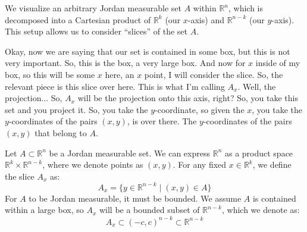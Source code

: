 \begin{math-stroke}
\begin{center}
\end{center}

\begin{explanation-of-steps}
We visualize an arbitrary Jordan measurable set $A$ within $\mathbb{R}^n$, which is decomposed into a Cartesian product of $\mathbb{R}^k$ (our $x$-axis) and $\mathbb{R}^{n-k}$ (our $y$-axis). This setup allows us to consider ``slices'' of the set $A$.
\end{explanation-of-steps}
\end{math-stroke}

\begin{spoken-clean}[00:00:39 - 00:01:23]
Okay, now we are saying that our set is contained in some box, but this is not very important. So, this is the box, a very large box. And now for $x$ inside of my box, so this will be some $x$ here, an $x$ point, I will consider the slice. So, the relevant piece is this slice over here. This is what I'm calling $A_x$. Well, the projection... So, $A_x$ will be the projection onto this axis, right? So, you take this set and you project it. So, you take the $y$-coordinate, so given the $x$, you take the $y$-coordinates of the pairs $(x,y)$, is over there. The $y$-coordinates of the pairs $(x,y)$ that belong to $A$.
\end{spoken-clean}

\begin{math-stroke}
Let $A \subset \mathbb{R}^n$ be a Jordan measurable set. We can express $\mathbb{R}^n$ as a product space $\mathbb{R}^k \times \mathbb{R}^{n-k}$, where we denote points as $(x,y)$.
For any fixed $x \in \mathbb{R}^k$, we define the slice $A_x$ as:
\[
A_x = \{ y \in \mathbb{R}^{n-k} \mid (x,y) \in A \}
\]
For $A$ to be Jordan measurable, it must be bounded. We assume $A$ is contained within a large box, so $A_x$ will be a bounded subset of $\mathbb{R}^{n-k}$, which we denote as:
\[
A_x \subset (-c,c)^{n-k} \subset \mathbb{R}^{n-k}
\]
\end{math-stroke}

